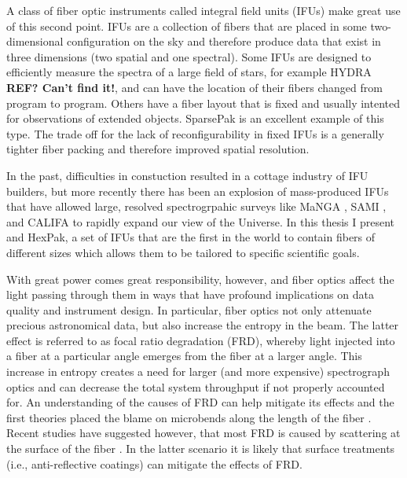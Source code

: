 A class of fiber optic instruments called integral field units (IFUs)
make great use of this second point. IFUs are a collection of fibers
that are placed in some two-dimensional configuration on the sky and
therefore produce data that exist in three dimensions (two spatial and
one spectral). Some IFUs are designed to efficiently measure the
spectra of a large field of stars, for example HYDRA {\bf REF? Can't
  find it!}, and can have the location of their fibers changed from
program to program. Others have a fiber layout that is fixed and
usually intented for observations of extended objects. SparsePak
\citep{Bershady04,Bershady05} is an excellent example of this
type. The trade off for the lack of reconfigurability in fixed IFUs is
a generally tighter fiber packing and therefore improved spatial
resolution.

In the past, difficulties in constuction resulted in a cottage
industry of IFU builders, but more recently there has been an
explosion of mass-produced IFUs that have allowed large, resolved
spectrogrpahic surveys like MaNGA \citep{Bundy15}, SAMI \citep{Croom12},
and CALIFA \citep{Sanchez12} to rapidly expand our view of the Universe. In
this thesis I present \GP and HexPak, a set of IFUs that are the first
in the world to contain fibers of different sizes which allows them to
be tailored to specific scientific goals.

With great power comes great responsibility, however, and fiber optics
affect the light passing through them in ways that have profound
implications on data quality and instrument design. In particular,
fiber optics not only attenuate precious astronomical data, but also
increase the entropy in the beam. The latter effect is referred to as
focal ratio degradation (FRD), whereby light injected into a fiber at
a particular angle emerges from the fiber at a larger angle. This
increase in entropy creates a need for larger (and more expensive)
spectrograph optics and can decrease the total system throughput if
not properly accounted for. An understanding of the causes of FRD can
help mitigate its effects and the first theories placed the blame on
microbends along the length of the fiber
\cite{Gloge72,Carrasco94}. Recent studies have suggested however, that
most FRD is caused by scattering at the surface of the fiber
\citep{Avila98,Haynes11,Eigenbrot12}. In the latter scenario it is
likely that surface treatments (i.e., anti-reflective coatings) can
mitigate the effects of FRD.

\clearpage
{} %



